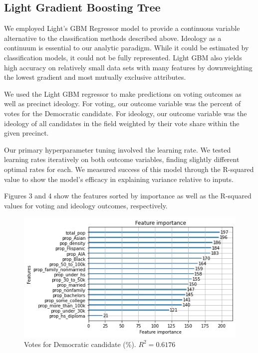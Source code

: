 \documentclass{article}
\begin{document}
\subsection{Light Gradient Boosting Tree}

We employed Light's GBM Regressor model to provide a continuous variable alternative
to the classification methods described above. Ideology as a continuum 
is essential to our analytic paradigm. While it could be estimated by classification
models, it could not be fully represented. Light GBM also yields high accuracy
on relatively small data sets with many features by downweighting the lowest gradient
and most mutually exclusive attributes.

We used the Light GBM regressor to make predictions on voting outcomes as well as
precinct ideology. For voting, our outcome variable was the percent of votes for the
Democratic candidate. For ideology, our outcome variable was the ideology of all
candidates in the field weighted by their vote share within the given precinct.

Our primary hyperparameter tuning involved the learning rate. We tested learning rates iteratively on both outcome variables, finding slightly different optimal rates for each.
We measured success of this model through the R-squared value to show the model's efficacy in explaining variance relative to inputs.

Figures 3 and 4 show the features sorted by importance as well as the R-squared values for voting and ideology outcomes, respectively.

\begin{figure}
  \centering
  \includegraphics[width=\textwidth]{perc_dem_feat_imp}
  \caption{Votes for Democratic candidate (\%). $R^2=0.6176$}
\end{figure}
\end{document}
